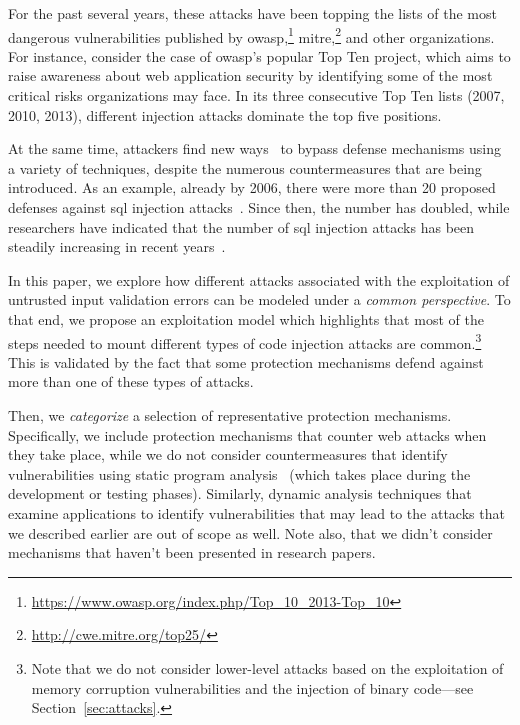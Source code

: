 \documentclass[10pt,journal,compsoc]{IEEEtran}
\begin{document}
For the past several years,
these attacks have been topping the lists of the most dangerous vulnerabilities
published by
{\sc owasp},\footnote{\url{https://www.owasp.org/index.php/Top_10_2013-Top_10}}
{\sc mitre},\footnote{\url{http://cwe.mitre.org/top25/}}
and other organizations.
For instance, consider the case of {\sc owasp}'s popular Top Ten
project,%
which aims to raise awareness about web application security by
identifying some of the most critical risks organizations may face.
In its three consecutive Top Ten lists (2007, 2010, 2013), different
injection attacks dominate the top five positions.

At the same time, attackers find new ways~\cite{HNSHS12,DKH14}
to bypass defense mechanisms using a variety of techniques,
despite the numerous countermeasures that are being introduced.
As an example, already by 2006,
there were more than 20 proposed defenses
against {\sc sql} injection attacks~\cite{HVO06}.
Since then, the number has doubled, while researchers have indicated that
the number of {\sc sql} injection attacks has been steadily
increasing in recent years~\cite{SSL12}.

In this paper, we explore how different attacks associated with 
the exploitation of untrusted input validation errors can be modeled 
under a {\it common perspective}. To that end, we propose an exploitation
model which highlights that most of the steps needed to mount
different types of code injection attacks are
common.\footnote{Note that we do not consider lower-level attacks based on
the exploitation of memory corruption vulnerabilities and the injection
of binary code---see Section~\ref{sec:attacks}.} This is validated by the fact that
some protection mechanisms defend against more than one of these
types of attacks.

Then, we {\it categorize} a selection of representative
protection mechanisms. Specifically, we include protection
mechanisms that counter web attacks when they take place,
while we do not consider countermeasures that identify
vulnerabilities using static program analysis~\cite{SZ12}
(which takes place during the development or testing
phases). Similarly, dynamic analysis techniques that examine
applications to identify vulnerabilities that may lead to the attacks
that we described earlier are out of scope as well. Note also, that we
didn't consider mechanisms that haven't been presented in research papers.
\end{document}
